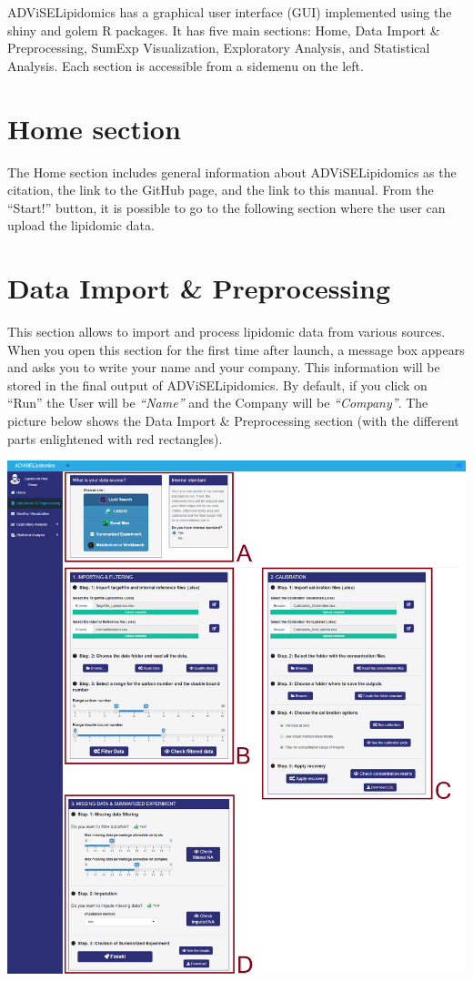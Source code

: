 \documentclass[
]{book}
\begin{document}
ADViSELipidomics has a graphical user interface (GUI) implemented using the shiny and golem R packages. It has five main sections: Home, Data Import \& Preprocessing, SumExp Visualization, Exploratory Analysis, and Statistical Analysis. Each section is accessible from a sidemenu on the left.

\hypertarget{sec31}{%
\section{Home section}\label{sec31}}

The Home section includes general information about ADViSELipidomics as the citation, the link to the GitHub page, and the link to this manual. From the ``Start!'' button, it is possible to go to the following section where the user can upload the lipidomic data.

\hypertarget{sec32}{%
\section{Data Import \& Preprocessing}\label{sec32}}

This section allows to import and process lipidomic data from various sources.
When you open this section for the first time after launch, a message box appears and asks you to write your name and your company. This information will be stored in the final output of ADViSELipidomics. By default, if you click on ``Run'' the User will be \emph{``Name''} and the Company will be \emph{``Company''}.
The picture below shows the Data Import \& Preprocessing section (with the different parts enlightened with red rectangles).

\includegraphics[width=1\linewidth]{images/module_inpute}
\end{document}
